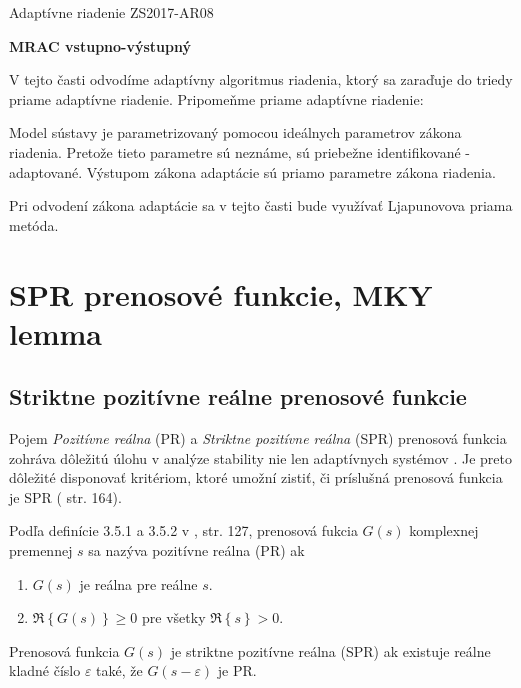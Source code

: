 ﻿\documentclass[a4paper, 10pt, ]{article}
\begin{document}
\def\oznacenieCasti{ZS2017-AR08}


\fontsize{12pt}{22pt}\selectfont

\centerline{\textsf{Adaptívne riadenie} \hfill \textsf{\oznacenieCasti}}


\fontsize{18pt}{22pt}\selectfont

\begin{flushleft}
	\textbf{\textsf{MRAC vstupno-výstupný}}
\end{flushleft}




\normalsize

\bigskip

\tableofcontents

\bigskip




\vspace{18pt}

\noindent
V tejto časti odvodíme adaptívny algoritmus riadenia, ktorý sa zaraďuje do triedy priame adaptívne riadenie. Pripomeňme priame adaptívne riadenie:

\noindent
Model sústavy je parametrizovaný pomocou ideálnych parametrov zákona riadenia. Pretože tieto parametre sú neznáme, sú priebežne identifikované - adaptované. Výstupom zákona adaptácie sú priamo parametre zákona riadenia.

\medskip
\noindent
Pri odvodení zákona adaptácie sa v tejto časti bude využívať Ljapunovova priama metóda.







\section{SPR prenosové funkcie, MKY lemma}





\subsection{Striktne pozitívne reálne prenosové funkcie}


Pojem \emph{Pozitívne reálna} (PR) a \emph{Striktne pozitívne reálna} (SPR) prenosová funkcia zohráva dôležitú úlohu v analýze stability nie len adaptívnych systémov \cite{IF06}. Je preto dôležité disponovať kritériom, ktoré umožní zistiť, či príslušná prenosová funkcia je SPR (\cite{MH93} str. 164).

Podľa definície 3.5.1 a 3.5.2 v \cite{IF06}, str. 127, prenosová fukcia $G(s)$ komplexnej premennej $s$ sa nazýva pozitívne reálna (PR) ak
\begin{enumerate}
	\item $G(s)$ je reálna pre reálne $s$.
	\item $\Re \left\{ G(s) \right\} \geq 0$ pre všetky $\Re \left\{ s \right\} > 0$.
\end{enumerate}
Prenosová funkcia $G(s)$ je striktne pozitívne reálna (SPR) ak existuje reálne kladné číslo $\varepsilon$ také, že $G(s - \varepsilon)$ je PR.
\end{document}
